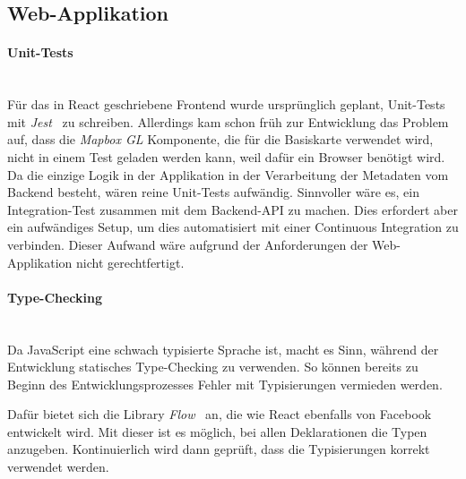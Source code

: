 \subsection{Web-Applikation}
\label{tests:Web-Applikation}

\paragraph{Unit-Tests}~\\
Für das in React geschriebene Frontend wurde ursprünglich geplant, Unit-Tests mit \emph{Jest}~\cite{jest} zu schreiben.
Allerdings kam schon früh zur Entwicklung das Problem auf, dass die \emph{Mapbox GL} Komponente, die für die Basiskarte verwendet wird, nicht in einem Test geladen werden kann, weil dafür ein Browser benötigt wird.
Da die einzige Logik in der Applikation in der Verarbeitung der Metadaten vom Backend besteht, wären reine Unit-Tests aufwändig.
Sinnvoller wäre es, ein Integration-Test zusammen mit dem Backend-API zu machen.
Dies erfordert aber ein aufwändiges Setup, um dies automatisiert mit einer Continuous Integration zu verbinden.
Dieser Aufwand wäre aufgrund der Anforderungen der Web-Applikation nicht gerechtfertigt.

\paragraph{Type-Checking}~\\
Da JavaScript eine schwach typisierte Sprache ist, macht es Sinn, während der Entwicklung statisches Type-Checking zu verwenden.
So können bereits zu Beginn des Entwicklungsprozesses Fehler mit Typisierungen vermieden werden.

Dafür bietet sich die Library \emph{Flow}~\cite{flow} an, die wie React ebenfalls von Facebook entwickelt wird.
Mit dieser ist es möglich, bei allen Deklarationen die Typen anzugeben.
Kontinuierlich wird dann geprüft, dass die Typisierungen korrekt verwendet werden.
